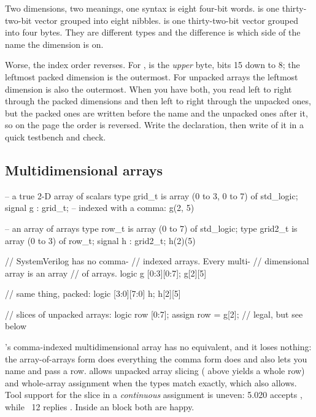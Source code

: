 \begin{gotcha}{Two dimensions, two meanings, one syntax}
 is eight four-bit words. 
is one thirty-two-bit vector grouped into eight nibbles. 
is one thirty-two-bit vector grouped into four bytes. They are different types
and the difference is which side of the name the dimension is on.

Worse, the index order reverses. For ,  is
the \emph{upper} byte, bits 15 down to 8; the leftmost packed dimension is the
outermost. For unpacked arrays the leftmost dimension is also the outermost.
When you have both, you read left to right through the packed dimensions and
then left to right through the unpacked ones, but the packed ones are written
before the name and the unpacked ones after it, so on the page the order is
reversed. Write the declaration, then write  of it in a quick
testbench and check.
\end{gotcha}

\subsection{Multidimensional arrays}

\begin{rosetta}
\begin{rleft}
-- a true 2-D array of scalars
type grid_t is array
  (0 to 3, 0 to 7) of std_logic;
signal g : grid_t;
-- indexed with a comma:
g(2, 5)

-- an array of arrays
type row_t is array (0 to 7)
  of std_logic;
type grid2_t is array (0 to 3)
  of row_t;
signal h : grid2_t;
h(2)(5)
\end{rleft}
\begin{rright}
// SystemVerilog has no comma-
// indexed arrays. Every multi-
// dimensional array is an array
// of arrays.
logic g [0:3][0:7];
g[2][5]

// same thing, packed:
logic [3:0][7:0] h;
h[2][5]

// slices of unpacked arrays:
logic row [0:7];
assign row = g[2];   // legal, but see below
\end{rright}
\end{rosetta}

\VHDL{}'s comma-indexed multidimensional array has no \SV{} equivalent, and it
loses nothing: the array-of-arrays form does everything the comma form does and
also lets you name and pass a row. \SV{} allows unpacked array slicing
( above yields a whole row) and whole-array assignment when the types
match exactly, which \VHDL{} also allows. Tool support for the slice in a
\emph{continuous} assignment is uneven:  5.020 accepts
, while ~12 replies
.
Inside an  block both are happy.

